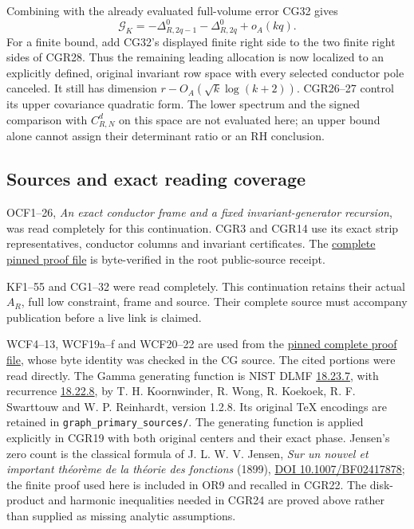 \documentclass[11pt]{article}
\begin{document}
Combining with the already evaluated full-volume error CG32 gives \[
\boxed{\mathcal G_K
=-\Delta_{R,2q-1}^0-\Delta_{R,2q}^0+o_A(kq).}
\tag{CGR29}
\] For a finite bound, add CG32's displayed finite right side to the two finite right sides of CGR28. Thus the remaining leading allocation is now localized to an explicitly defined, original invariant row space with every selected conductor pole canceled. It still has dimension \(r-O_A(\sqrt{k}\log(k+2))\). CGR26--27 control its upper covariance quadratic form. The lower spectrum and the signed comparison with \(C_{R,N}^d\) on this space are not evaluated here; an upper bound alone cannot assign their determinant ratio or an RH conclusion.

\subsection{Sources and exact reading coverage}\label{sources-and-exact-reading-coverage}

OCF1--26, \emph{An exact conductor frame and a fixed invariant-generator recursion}, was read completely for this continuation. CGR3 and CGR14 use its exact strip representatives, conductor columns and invariant certificates. The \href{https://github.com/KokunoYumeto/zeta-function-research-reader/blob/5992ad50c0f2a06921f1fcaded7b4e38097c0739/workbenches/splitzero-tandem/continuations/20260920-original-kernel-mixed-determinants/providers/ORIGINAL_CONDUCTOR_STRIP_FRAME.tex\#L27}{complete pinned proof file} is byte-verified in the root public-source receipt.

KF1--55 and CG1--32 were read completely. This continuation retains their actual \(A_R\), full low constraint, frame and source. Their complete source must accompany publication before a live link is claimed.

WCF4--13, WCF19a--f and WCF20--22 are used from the \href{https://github.com/KokunoYumeto/zeta-function-research-reader/blob/52274804051e325c8a6ef69c17b3958cc2caba0a/workbenches/splitzero-tandem/continuations/20260920-gamma-and-finite-derivative/providers/WEIGHTED_CONDUCTOR_FORWARD.tex}{pinned complete proof file}, whose byte identity was checked in the CG source. The cited portions were read directly. The Gamma generating function is NIST DLMF \href{https://dlmf.nist.gov/18.23.E7}{18.23.7}, with recurrence \href{https://dlmf.nist.gov/18.22.E8}{18.22.8}, by T. H. Koornwinder, R. Wong, R. Koekoek, R. F. Swarttouw and W. P. Reinhardt, version 1.2.8. Its original TeX encodings are retained in \nolinkurl{graph_primary_sources/}. The generating function is applied explicitly in CGR19 with both original centers and their exact phase. Jensen's zero count is the classical formula of J. L. W. V. Jensen, \emph{Sur un nouvel et important théorème de la théorie des fonctions} (1899), \href{https://doi.org/10.1007/BF02417878}{DOI 10.1007/BF02417878}; the finite proof used here is included in OR9 and recalled in CGR22. The disk-product and harmonic inequalities needed in CGR24 are proved above rather than supplied as missing analytic assumptions.
\end{document}
